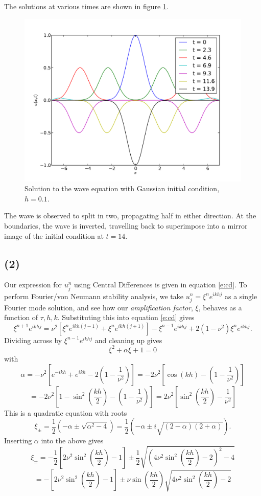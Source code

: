 \documentclass[10pt]{article}
\newcommand{\ujn}{u_{j}^{n}}
\newcommand{\eihjk}{e^{ikhj}}
\newcommand{\eihjpk}{e^{ikh(j+1)}}
\newcommand{\eihjmk}{e^{ikh(j-1)}}
\begin{document}
The solutions at various times are shown in figure \ref{f:dirichlet}.
\begin{figure}
  \centering
  \includegraphics[width=\textwidth]{1/dirichlet.pdf}
  \caption{Solution to the wave equation with Gaussian initial condition, $h=0.1$.}
  \label{f:dirichlet}
\end{figure}
The wave is observed to split in two, propagating half in either direction.
At the boundaries, the wave is inverted, travelling back to superimpose into
a mirror image of the initial condition at $t=14$.

\clearpage
\subsection*{(2)}
Our expression for $\ujn$ using Central Differences is given in equation \ref{e:cd}.
To perform Fourier/von Neumann stability analysis, we take $\ujn = \xi^n \eihjk$ as
a single Fourier mode solution, and see how our {\it amplification factor}, $\xi$,
behaves as a function of $\tau,h,k$.
Substituting this into equation \ref{e:cd} gives
$$
\xi^{n+1} \eihjk= \nu^2 \left[ \xi^n \eihjmk + \xi^n \eihjpk \right] - \xi^{n-1} \eihjk +
2(1 - \nu^2) \xi^n \eihjk.
$$
Dividing across by $\xi^{n-1} \eihjk$ and cleaning up gives
\begin{equation}
\xi^2 + \alpha \xi + 1 = 0
\label{e:quad}
\end{equation}
with
$$\alpha = -\nu^2 \left[ e^{-ikh} + e^{ikh} - 2\left(1 - \frac{1}{\nu^2}\right) \right]
= -2 \nu^2 \left[ \cos(kh) - \left(1 - \frac{1}{\nu^2}\right) \right] $$
$$= -2 \nu^2 \left[ 1 - \sin^2\left(\frac{kh}{2}\right) - \left(1 - \frac{1}{\nu^2}\right) \right]
=  2 \nu^2 \left[ \sin^2\left(\frac{kh}{2}\right) - \frac{1}{\nu^2} \right] $$
This is a quadratic equation with roots
$$
\xi_\pm = \frac{1}{2} \left( -\alpha \pm \sqrt{\alpha^2 - 4} \right) =
\frac{1}{2} \left( -\alpha \pm i\sqrt{(2 - \alpha)(2+\alpha)}\right).
$$
Inserting $\alpha$ into the above gives
$$ \xi_\pm = -\frac{1}{2}\left[2\nu^2 \sin^2\left(\frac{kh}{2}\right) -1 \right]
\pm \frac{1}{2}\sqrt{\left(4\nu^2\sin^2\left(\frac{kh}{2}\right) -2\right)^2 - 4}
$$
$$ = -\left[2\nu^2 \sin^2\left(\frac{kh}{2}\right) -1 \right]
\pm \nu\sin\left(\frac{kh}{2}\right)\sqrt{4\nu^2\sin^2\left(\frac{kh}{2}\right) -2}
$$
\end{document}
